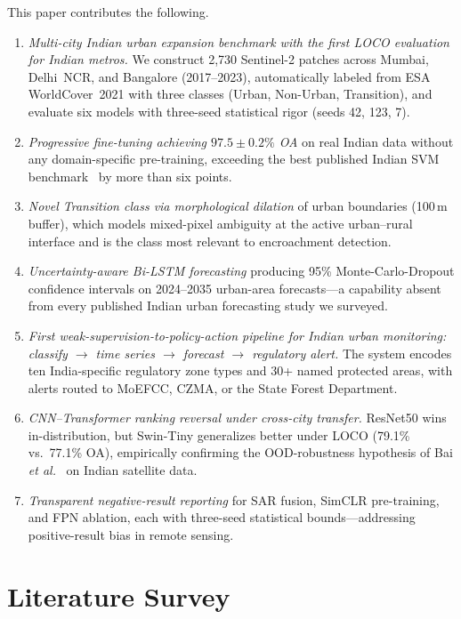 \documentclass[conference]{IEEEtran}
\begin{document}
This paper contributes the following.
\begin{enumerate}
  \item \textit{Multi-city Indian urban expansion benchmark with the first LOCO evaluation for Indian metros.} We construct 2{,}730 Sentinel-2 patches across Mumbai, Delhi~NCR, and Bangalore (2017--2023), automatically labeled from ESA WorldCover~2021 with three classes (Urban, Non-Urban, Transition), and evaluate six models with three-seed statistical rigor (seeds 42, 123, 7).
  \item \textit{Progressive fine-tuning achieving ${97.5 \pm 0.2\%}$ OA} on real Indian data without any domain-specific pre-training, exceeding the best published Indian SVM benchmark~\cite{chamoli2024} by more than six points.
  \item \textit{Novel Transition class via morphological dilation} of urban boundaries (100\,m buffer), which models mixed-pixel ambiguity at the active urban--rural interface and is the class most relevant to encroachment detection.
  \item \textit{Uncertainty-aware Bi-LSTM forecasting} producing 95\% Monte-Carlo-Dropout confidence intervals on 2024--2035 urban-area forecasts---a capability absent from every published Indian urban forecasting study we surveyed.
  \item \textit{First weak-supervision-to-policy-action pipeline for Indian urban monitoring: classify $\to$ time series $\to$ forecast $\to$ regulatory alert.} The system encodes ten India-specific regulatory zone types and 30+ named protected areas, with alerts routed to MoEFCC, CZMA, or the State Forest Department.
  \item \textit{CNN--Transformer ranking reversal under cross-city transfer.} ResNet50 wins in-distribution, but Swin-Tiny generalizes better under LOCO (79.1\% vs.\ 77.1\% OA), empirically confirming the OOD-robustness hypothesis of Bai \emph{et al.}~\cite{bai2021} on Indian satellite data.
  \item \textit{Transparent negative-result reporting} for SAR fusion, SimCLR pre-training, and FPN ablation, each with three-seed statistical bounds---addressing positive-result bias in remote sensing.
\end{enumerate}

\section{Literature Survey}
\end{document}
